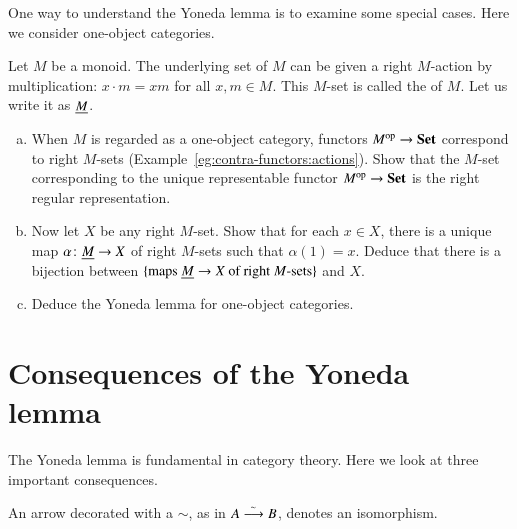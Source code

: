 \begin{question}
One way to understand the Yoneda lemma is to examine some special
cases.  Here we consider one-object%
%
%
%
categories.

Let $M$ be a monoid.  The underlying set of $M$ can be given a right
$M$-action by multiplication: $x \cdot m = xm$ for all $x, m \in M$.  This
$M$-set is called the  of $M$.  Let us write it as $\underline{M}$.

\begin{enumerate}[(b)]
\item
When $M$ is regarded as a one-object category, functors $M^{\mathrm{op}} \to \mathbf{Set}$
correspond to right $M$-sets (Example~\ref{eg:contra-functors:actions}).
Show that the $M$-set corresponding to the unique representable functor
$M^{\mathrm{op}} \to \mathbf{Set}$ is the right regular representation.

\item
Now let $X$ be any right $M$-set.  Show that for each $x \in X$, there is a
unique map $\alpha\from \rreg{M} \to X$ of right $M$-sets such that
$\alpha(1) = x$.  Deduce that there is a bijection between $ \{ \text{maps
} \underline{M} \to X \text{ of right }M\text{-sets} \} $ and $X$.

\item
Deduce the Yoneda lemma for one-object categories.
\end{enumerate}
\end{question}



\section{Consequences of the Yoneda lemma}


The Yoneda lemma is fundamental in category theory.  Here we look at three
important consequences.

\begin{notn}
An arrow decorated with a $\sim$, as in $A \stackrel{\textstyle{}_\sim}{\longrightarrow} B$,%
%
%
 denotes an isomorphism.
\end{notn}


%
%

